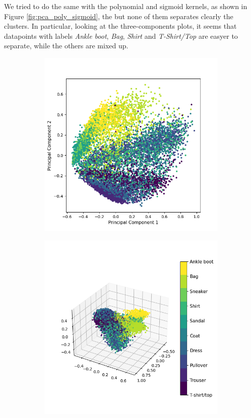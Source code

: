 \documentclass[12pt]{article}
\begin{document}
We tried to do the same with the polynomial and sigmoid kernels, as shown in Figure \ref{fig:pca_poly_sigmoid}, the  but none of them separates clearly the clusters. In particular, looking at the three-components plots,  it seems that datapoints with labels \textit{Ankle boot}, \textit{Bag}, \textit{Shirt}  and \textit{T-Shirt/Top} are easyer to separate, while the others are mixed up.
\begin{figure}[h]
	\begin{subfigure}{0.5\textwidth}
		\includegraphics[width=0.4\textheight]{pca_poly_2comps.png}
		\caption{}
		\label{subfig:pca_poly_2comps}
	\end{subfigure}
	\begin{subfigure}{0.5\textwidth}
		\includegraphics[width=0.4\textheight]{pca_poly_3comps.png}

\end{subfigure}
\end{figure}
\end{document}
